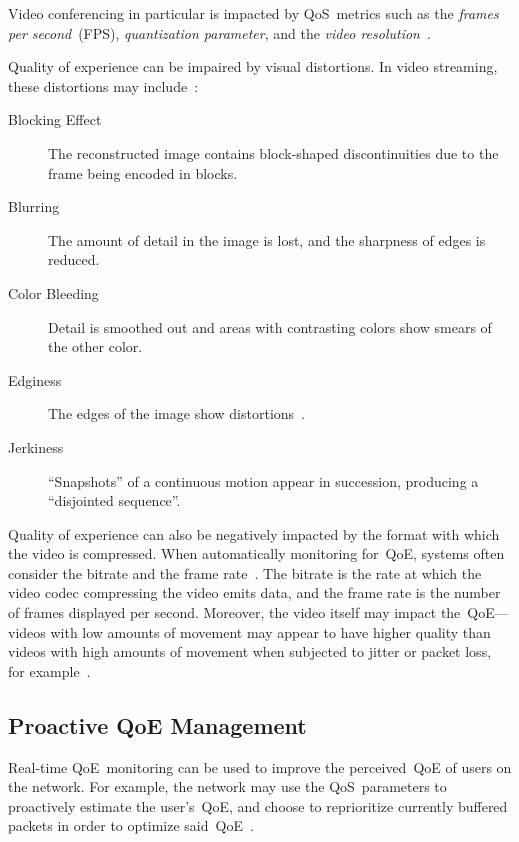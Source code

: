         Video conferencing in particular is impacted by QoS~metrics such as the \emph{frames per second}~(FPS), \emph{quantization parameter}, and the \emph{video resolution}~\autocite{MacMillanKyle2021MtPa}.

        Quality of experience can be impaired by visual distortions. In video streaming, these distortions may include~\autocite{YuenMichael1998Asoh}:

        \begin{description}
            \item[Blocking Effect] The reconstructed image contains block-shaped discontinuities due to the frame being encoded in blocks.
            \item[Blurring] The amount of detail in the image is lost, and the sharpness of edges is reduced.
            \item[Color Bleeding] Detail is smoothed out and areas with contrasting colors show smears of the other color.
            \item[Edginess] The edges of the image show distortions~\autocite{ChenYanjiao2015FQtQ}.
            \item[Jerkiness] \enquote{Snapshots} of a continuous motion appear in succession, producing a \enquote{disjointed sequence}.
        \end{description}

        Quality of experience can also be negatively impacted by the format with which the video is compressed. When automatically monitoring for~QoE, systems often consider the bitrate and the frame rate~\autocite{ChenYanjiao2015FQtQ}. The bitrate is the rate at which the video codec compressing the video emits data, and the frame rate is the number of frames displayed per second. Moreover, the video itself may impact the~QoE---videos with low amounts of movement may appear to have higher quality than videos with high amounts of movement when subjected to jitter or packet loss, for example~\autocite{ChenYanjiao2015FQtQ}.


    \subsection{Proactive QoE Management}\label{introduction:applications:management}
        Real-time QoE~monitoring can be used to improve the perceived~QoE of users on the network. For example, the network may use the QoS~parameters to proactively estimate the user's~QoE, and choose to reprioritize currently buffered packets in order to optimize said~QoE~\autocite{DinakiHosseinEbrahimi2021FVQW}.

